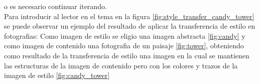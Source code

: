 \documentclass[a4paper,11pt,spanish]{book}
\begin{document}
    o es necesario continuar iterando. \\
    Para introducir al lector en el tema en la figura \ref{fig:style_transfer_candy_tower} se puede observar un ejemplo del resultado de aplicar la transferencia de estilo en fotografias:
    Como imagen de estilo se eligio una imagen abstracta \ref{fig:candy} y como imagen de contenido una fotografia de un paisaje \ref{fig:tower}, obteniendo como resultado de la
    transferencia de estilo una imagen en la cual se mantienen las estructuras de la imagen de contenido pero con los colores y trazos de la imagen de estilo \ref{fig:candy_tower}
    \begin{figure}[h]




\end{figure}
\end{document}
